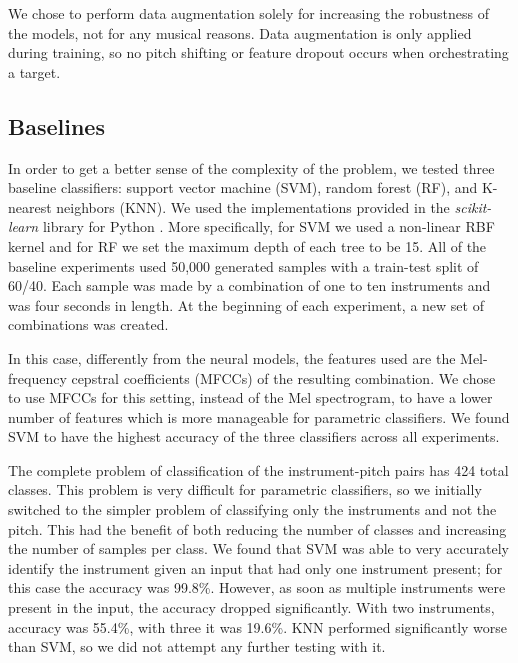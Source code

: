 \documentclass[runningheads,a4paper]{llncs}
\begin{document}
We chose to perform data augmentation solely for increasing the robustness of the models, not for any musical reasons. Data augmentation is only applied during training, so no pitch shifting or feature dropout occurs when orchestrating a target.

\subsection{Baselines}
\label{sec:baseline}

In order to get a better sense of the complexity of the problem, we tested three baseline classifiers: support vector machine (SVM), random forest (RF), and K-nearest neighbors (KNN). We used the implementations provided in the \emph{scikit-learn }library for Python \cite{scikit-learn}. More specifically, for SVM we used a non-linear RBF kernel and for RF we set the maximum depth of each tree to be 15. All of the baseline experiments used 50,000 generated samples with a train-test split of 60/40. Each sample was made by a combination of one to ten instruments and was four seconds in length. At the beginning of each experiment, a new set of combinations was created.

In this case, differently from the neural models, the features used are the Mel-frequency cepstral coefficients (MFCCs) of the resulting combination. We chose to use MFCCs for this setting, instead of the Mel spectrogram, to have a lower number of features which is more manageable for parametric classifiers. We found SVM to have the highest accuracy of the three classifiers across all experiments.

The complete problem of classification of the instrument-pitch pairs has 424 total classes. This problem is very difficult for parametric classifiers, so we initially switched to the simpler problem of classifying only the instruments and not the pitch. This had the benefit of both reducing the number of classes and increasing the number of samples per class. We found that SVM was able to very accurately identify the instrument given an input that had only one instrument present; for this case the accuracy was 99.8\%. However, as soon as multiple instruments were present in the input, the accuracy dropped significantly. With two instruments, accuracy was 55.4\%, with three it was 19.6\%. KNN performed significantly worse than SVM, so we did not attempt any further testing with it.
\end{document}
